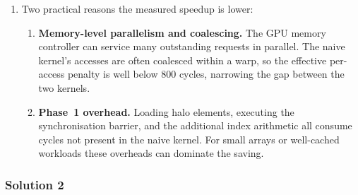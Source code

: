 \begin{enumerate}[label=(\alph*)]
  \item Two practical reasons the measured speedup is lower:
        \begin{enumerate}[label=\roman*.]
          \item \textbf{Memory-level parallelism and coalescing.}  The GPU
                memory controller can service many outstanding requests in
                parallel.  The naive kernel's accesses are often coalesced
                within a warp, so the effective per-access penalty is well
                below 800 cycles, narrowing the gap between the two kernels.
          \item \textbf{Phase~1 overhead.}  Loading halo elements, executing
                the synchronisation barrier, and the additional index
                arithmetic all consume cycles not present in the naive
                kernel.  For small arrays or well-cached workloads these
                overheads can dominate the saving.
        \end{enumerate}
\end{enumerate}


\subsubsection{Solution 2}

